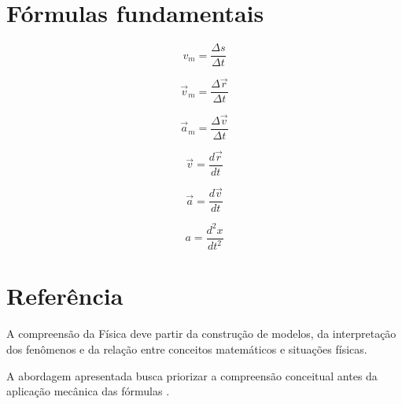 \documentclass[a4paper,12pt]{article}
\newcommand{\printingbibliography}{%
    \pagestyle{myheadings}
    \markright{}
    \sloppy
    \printbibliography[
        heading=bibintoc,
        title=Referências
    ]
    \fussy
}
\begin{document}
\section{Fórmulas fundamentais}

\begin{center}

\[
\boxed{
v_m=
\frac{\Delta s}{\Delta t}
}
\]

\vspace{0.3cm}

\[
\boxed{
\vec v_m=
\frac{\Delta\vec r}{\Delta t}
}
\]

\vspace{0.3cm}

\[
\boxed{
\vec a_m=
\frac{\Delta\vec v}{\Delta t}
}
\]

\vspace{0.3cm}

\[
\boxed{
\vec v=
\frac{d\vec r}{dt}
}
\]

\vspace{0.3cm}

\[
\boxed{
\vec a=
\frac{d\vec v}{dt}
}
\]

\vspace{0.3cm}

\[
\boxed{
a=
\frac{d^2x}{dt^2}
}
\]

\end{center}



\section*{Referência}

A compreensão da Física deve partir da construção de modelos,
da interpretação dos fenômenos e da relação entre conceitos
matemáticos e situações físicas.

A abordagem apresentada busca priorizar a compreensão conceitual
antes da aplicação mecânica das fórmulas
\cite{feynman1964feynman}.



\printingbibliography
\end{document}
